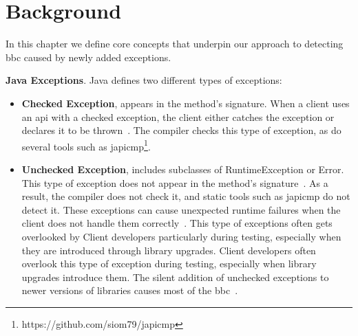 \chapter{Background}\label{background}

In this chapter we define core concepts that underpin our approach to detecting \gls{bbc} caused by newly added exceptions.

\textbf{Java Exceptions}. Java defines two different types of exceptions: 
\begin{itemize}
    \item \textbf{Checked Exception}, appears in the method's signature. When a client uses an \gls{api} with a checked exception, the client either catches the exception or declares it to be thrown~\cite{Sousa2020evolution}. The compiler checks this type of exception, as do several tools such as japicmp\footnote{https://github.com/siom79/japicmp}.
    \item \textbf{Unchecked Exception}, includes subclasses of RuntimeException or Error. This type of exception does not appear in the method's signature~\cite{Asaduzzaman2017}. As a result, the compiler does not check it, and static tools such as japicmp do not detect it. These exceptions can cause unexpected runtime failures when the client does not handle them correctly~\cite{Padua2017}. This type of exceptions often gets overlooked by Client developers particularly during testing, especially when they are introduced through library upgrades. Client developers often overlook this type of exception during testing, especially when library upgrades introduce them. The silent addition of unchecked exceptions to newer versions of libraries causes most of the \gls{bbc}~\cite{Cossette2012}.
\end{itemize}

